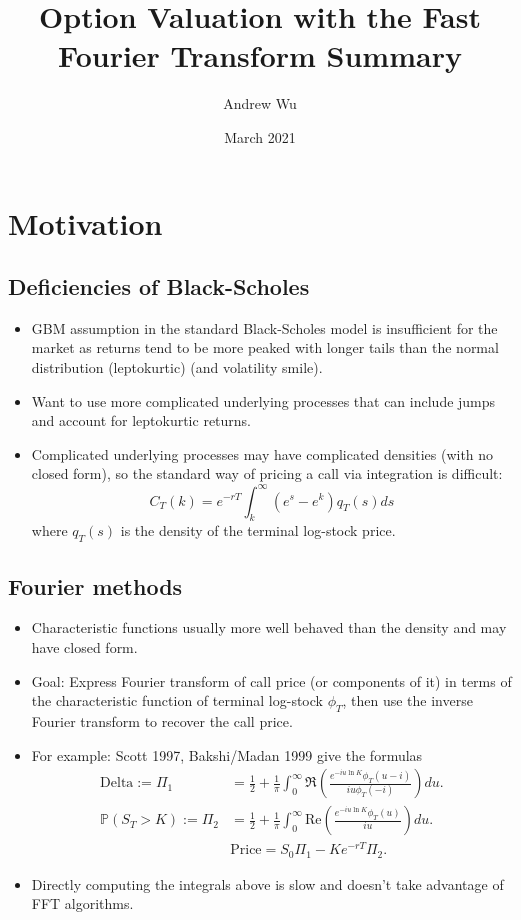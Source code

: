\documentclass[11pt]{article}
\title{\textbf{Option Valuation with the Fast Fourier Transform Summary}}
\author{Andrew Wu}
\date{March 2021}
\begin{document}
	\maketitle
	\section{Motivation}
		\subsection{Deficiencies of Black-Scholes}
		\begin{itemize}
			\item GBM assumption in the standard Black-Scholes model is insufficient for the market as returns tend to be more peaked with longer tails than the normal distribution (leptokurtic) (and volatility smile). 
			\item Want to use more complicated underlying processes that can include jumps and account for leptokurtic returns.
			\item Complicated underlying processes may have complicated densities (with no closed form), so the standard way of pricing a call via integration is difficult:
			\[	C_{T}(k) = e^{-rT}\int_{k}^{\infty} (e^{s} - e^{k}) q_{T}(s)ds
					\]
			where $q_{T}(s)$ is the density of the terminal log-stock price.
			\end{itemize}
		\subsection{Fourier methods}
		
		\begin{itemize}
			\item Characteristic functions usually more well behaved than the density and may have closed form. 
			\item Goal: Express Fourier transform of call price (or components of it) in terms of the characteristic function of terminal log-stock \( \phi_{T} \), then use the inverse Fourier transform to recover the call price.
			\item For example: Scott 1997, Bakshi/Madan 1999 give the formulas
			\begin{align*}
				\text{Delta}:=\Pi_1 &= \frac{1}{2} + \frac{1}{\pi}\int_{0}^{\infty}\Re\left(\frac{e^{-iu\ln K}\phi_{T}(u - i)}{iu\phi_{T}(-i)}\right)du.\\
				\mathbb{P}\left(S_T > K\right) := \Pi_{2} &=   \frac{1}{2} + \frac{1}{\pi}\int_{0}^{\infty} \text{Re} \left(\frac{e^{-iu\ln K }\phi_{T}(u)}{iu}\right)du.\\
				&\text{Price} = S_0 \Pi_{1} - Ke^{-rT} \Pi_{2}.
				\end{align*}
		
			\item Directly computing the integrals above is slow and doesn't take advantage of FFT algorithms. 
			\end{itemize}
		
\end{document}
